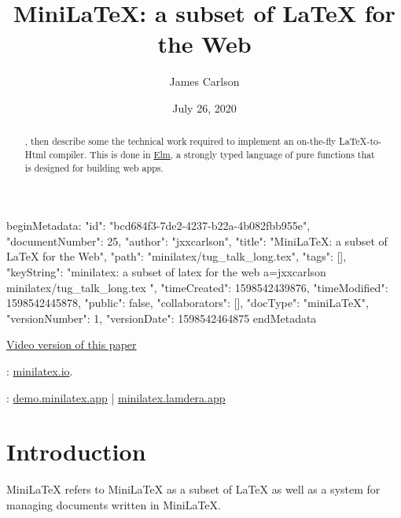 beginMetadata:
{
    "id": "bcd684f3-7de2-4237-b22a-4b082fbb955e",
    "documentNumber": 25,
    "author": "jxxcarlson",
    "title": "MiniLaTeX: a subset of LaTeX for the Web",
    "path": "minilatex/tug_talk_long.tex",
    "tags": [],
    "keyString": "minilatex: a subset of latex for the web a=jxxcarlson minilatex/tug_talk_long.tex ",
    "timeCreated": 1598542439876,
    "timeModified": 1598542445878,
    "public": false,
    "collaborators": [],
    "docType": "miniLaTeX",
    "versionNumber": 1,
    "versionDate": 1598542464875
}
endMetadata
\title{MiniLaTeX: a subset of LaTeX for the Web}
\author{James Carlson}
\date{July 26, 2020}

\maketitle


\tableofcontents


\href{https://youtu.be/TAIYpCc3VV0}{Video version of this paper}

\begin{abstract}
, then describe some the technical work required to implement an on-the-fly LaTeX-to-Html compiler.  This is done in \href{https://elm-lang.org}{Elm}, a strongly typed language of pure functions that is designed for building web apps.
\end{abstract}

: \href{https://minilatex.io}{minilatex.io}.

:  \href{https://demo.minilatex.app/}{demo.minilatex.app} |
\href{https://minilatex.lamdera.app/}{minilatex.lamdera.app}


\section{Introduction}

MiniLaTeX refers to MiniLaTeX as a subset of LaTeX as well as a system for managing documents written in MiniLaTeX.


